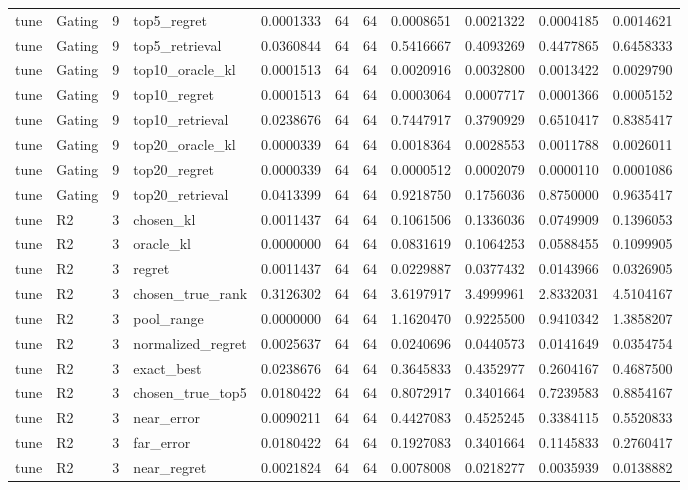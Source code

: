 \begin{tabular}{llrlrrrrrrr}
tune & Gating & 9 & top5_regret & 0.0001333 & 64 & 64 & 0.0008651 & 0.0021322 & 0.0004185 & 0.0014621 \\
tune & Gating & 9 & top5_retrieval & 0.0360844 & 64 & 64 & 0.5416667 & 0.4093269 & 0.4477865 & 0.6458333 \\
tune & Gating & 9 & top10_oracle_kl & 0.0001513 & 64 & 64 & 0.0020916 & 0.0032800 & 0.0013422 & 0.0029790 \\
tune & Gating & 9 & top10_regret & 0.0001513 & 64 & 64 & 0.0003064 & 0.0007717 & 0.0001366 & 0.0005152 \\
tune & Gating & 9 & top10_retrieval & 0.0238676 & 64 & 64 & 0.7447917 & 0.3790929 & 0.6510417 & 0.8385417 \\
tune & Gating & 9 & top20_oracle_kl & 0.0000339 & 64 & 64 & 0.0018364 & 0.0028553 & 0.0011788 & 0.0026011 \\
tune & Gating & 9 & top20_regret & 0.0000339 & 64 & 64 & 0.0000512 & 0.0002079 & 0.0000110 & 0.0001086 \\
tune & Gating & 9 & top20_retrieval & 0.0413399 & 64 & 64 & 0.9218750 & 0.1756036 & 0.8750000 & 0.9635417 \\
tune & R2 & 3 & chosen_kl & 0.0011437 & 64 & 64 & 0.1061506 & 0.1336036 & 0.0749909 & 0.1396053 \\
tune & R2 & 3 & oracle_kl & 0.0000000 & 64 & 64 & 0.0831619 & 0.1064253 & 0.0588455 & 0.1099905 \\
tune & R2 & 3 & regret & 0.0011437 & 64 & 64 & 0.0229887 & 0.0377432 & 0.0143966 & 0.0326905 \\
tune & R2 & 3 & chosen_true_rank & 0.3126302 & 64 & 64 & 3.6197917 & 3.4999961 & 2.8332031 & 4.5104167 \\
tune & R2 & 3 & pool_range & 0.0000000 & 64 & 64 & 1.1620470 & 0.9225500 & 0.9410342 & 1.3858207 \\
tune & R2 & 3 & normalized_regret & 0.0025637 & 64 & 64 & 0.0240696 & 0.0440573 & 0.0141649 & 0.0354754 \\
tune & R2 & 3 & exact_best & 0.0238676 & 64 & 64 & 0.3645833 & 0.4352977 & 0.2604167 & 0.4687500 \\
tune & R2 & 3 & chosen_true_top5 & 0.0180422 & 64 & 64 & 0.8072917 & 0.3401664 & 0.7239583 & 0.8854167 \\
tune & R2 & 3 & near_error & 0.0090211 & 64 & 64 & 0.4427083 & 0.4525245 & 0.3384115 & 0.5520833 \\
tune & R2 & 3 & far_error & 0.0180422 & 64 & 64 & 0.1927083 & 0.3401664 & 0.1145833 & 0.2760417 \\
tune & R2 & 3 & near_regret & 0.0021824 & 64 & 64 & 0.0078008 & 0.0218277 & 0.0035939 & 0.0138882 \\

\end{tabular}
